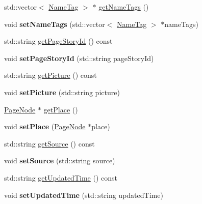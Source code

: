 \begin{DoxyCompactItemize}
\item 
std\+::vector$<$ \hyperlink{classfl4cpp_1_1_name_tag}{Name\+Tag} $>$ $\ast$ \hyperlink{classfl4cpp_1_1_photo_node_ac2077f3ebacf91104766dd053a7be87b}{get\+Name\+Tags} ()
\item 
void {\bfseries set\+Name\+Tags} (std\+::vector$<$ \hyperlink{classfl4cpp_1_1_name_tag}{Name\+Tag} $>$ $\ast$name\+Tags)\hypertarget{classfl4cpp_1_1_photo_node_a35a35c13cb2648aa392c0b759fbe306f}{}\label{classfl4cpp_1_1_photo_node_a35a35c13cb2648aa392c0b759fbe306f}

\item 
std\+::string \hyperlink{classfl4cpp_1_1_photo_node_a5592e1494cf8efe61f0d757f56921eb6}{get\+Page\+Story\+Id} () const 
\item 
void {\bfseries set\+Page\+Story\+Id} (std\+::string page\+Story\+Id)\hypertarget{classfl4cpp_1_1_photo_node_afa27446ab3205922abd9e4064ba5bedc}{}\label{classfl4cpp_1_1_photo_node_afa27446ab3205922abd9e4064ba5bedc}

\item 
std\+::string \hyperlink{classfl4cpp_1_1_photo_node_afc1069470fc81ffe2e65c3bb94a55c64}{get\+Picture} () const 
\item 
void {\bfseries set\+Picture} (std\+::string picture)\hypertarget{classfl4cpp_1_1_photo_node_a771b40dd0629b03caedadc755a228eff}{}\label{classfl4cpp_1_1_photo_node_a771b40dd0629b03caedadc755a228eff}

\item 
\hyperlink{classfl4cpp_1_1_page_node}{Page\+Node} $\ast$ \hyperlink{classfl4cpp_1_1_photo_node_a6c2905fe16706aec88b91a9684692fef}{get\+Place} ()
\item 
void {\bfseries set\+Place} (\hyperlink{classfl4cpp_1_1_page_node}{Page\+Node} $\ast$place)\hypertarget{classfl4cpp_1_1_photo_node_a1451ffa7057a4d53ae63d2b4e2013806}{}\label{classfl4cpp_1_1_photo_node_a1451ffa7057a4d53ae63d2b4e2013806}

\item 
std\+::string \hyperlink{classfl4cpp_1_1_photo_node_ac7748f9924f138837c190c71def13002}{get\+Source} () const 
\item 
void {\bfseries set\+Source} (std\+::string source)\hypertarget{classfl4cpp_1_1_photo_node_a63245d1835cf100124a7d082f34c2daa}{}\label{classfl4cpp_1_1_photo_node_a63245d1835cf100124a7d082f34c2daa}

\item 
std\+::string \hyperlink{classfl4cpp_1_1_photo_node_a0e845f4aacdfd8ad092cd362b8f3a3a3}{get\+Updated\+Time} () const 
\item 
void {\bfseries set\+Updated\+Time} (std\+::string updated\+Time)\hypertarget{classfl4cpp_1_1_photo_node_a3b37d51fef5cb589b4ee049c126e9992}{}\label{classfl4cpp_1_1_photo_node_a3b37d51fef5cb589b4ee049c126e9992}


\end{DoxyCompactItemize}
